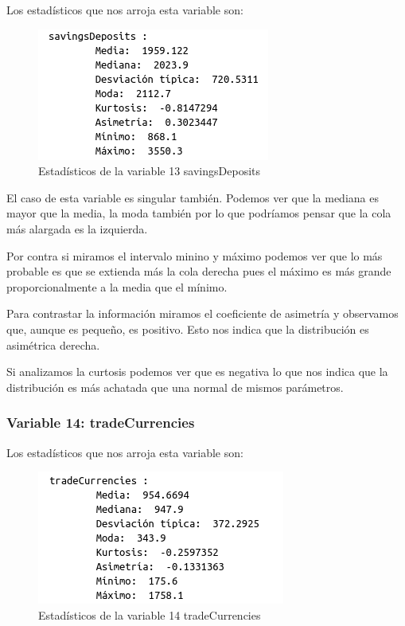 \documentclass[12pt,a4paper]{article}
\begin{document}
Los estadísticos que nos arroja esta variable son:

\begin{figure}[H]
	\centering
	\includegraphics[scale=0.7]{./Imagenes/EDA/Regresion/estadisticos_savingsDeposits.png}
	\caption{Estadísticos de la variable 13 savingsDeposits}
\end{figure}

El caso de esta variable es singular también. Podemos ver que la mediana es mayor que la media, la moda también por lo que podríamos pensar que la cola más alargada es la izquierda. 

Por contra si miramos el intervalo minino y máximo podemos ver que lo más probable es que se extienda más la cola derecha pues el máximo es más grande proporcionalmente a la media que el mínimo. 

Para contrastar la información miramos el coeficiente de asimetría y observamos que, aunque es pequeño, es positivo. Esto nos indica que la distribución es asimétrica derecha.

Si analizamos la curtosis podemos ver que es negativa lo que nos indica que la distribución es más achatada que una normal de mismos parámetros.

\subsubsection*{Variable 14: tradeCurrencies}

Los estadísticos que nos arroja esta variable son:

\begin{figure}[H]
	\centering
	\includegraphics[scale=0.7]{./Imagenes/EDA/Regresion/estadisticos_tradeCurrencies.png}
	\caption{Estadísticos de la variable 14 tradeCurrencies}
\end{figure}
\end{document}
